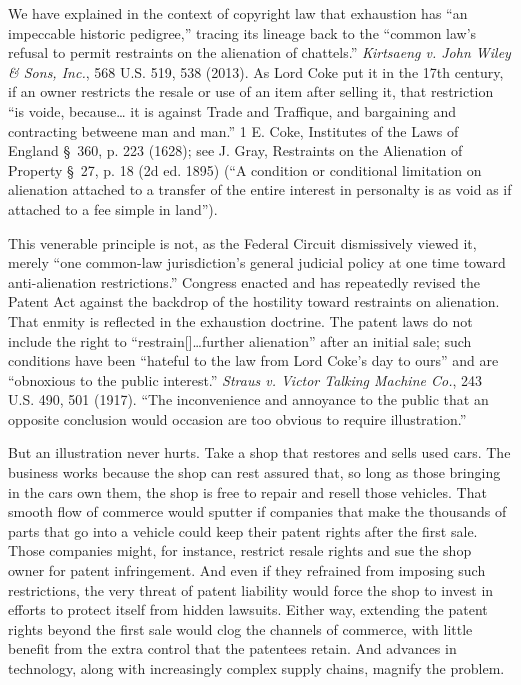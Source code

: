We have explained in the context of copyright law that exhaustion has ``an
impeccable historic pedigree,'' tracing its lineage back to the ``common law's
refusal to permit restraints on the alienation of chattels.'' \textit{Kirtsaeng
v. John Wiley \& Sons, Inc.}, 568 U.S. 519, 538
(2013). As Lord Coke put it in the 17th century, if an owner restricts the
resale or use of an item after selling it, that restriction ``is voide,
because\ldots
it is against Trade and Traffique, and bargaining and contracting betweene
man and man.'' 1 E. Coke, Institutes of the Laws of England \S~360, p. 223
(1628); see J. Gray, Restraints on the Alienation of Property \S~27, p. 18 (2d
ed. 1895) (``A condition or conditional limitation on alienation attached to a
transfer of the entire interest in personalty is as void as if attached to a fee
simple in land'').

This venerable principle is not, as the Federal Circuit dismissively viewed it,
merely ``one common-law jurisdiction's general judicial policy at one time
toward anti-alienation restrictions.'' Congress enacted and
has repeatedly revised the Patent Act against the backdrop of the hostility
toward restraints on alienation. That enmity is reflected in the exhaustion
doctrine. The patent laws do not include the right to ``restrain[]\ldots further
alienation'' after an initial sale; such conditions have been ``hateful to the
law from Lord Coke's day to ours'' and are ``obnoxious to the public interest.''
\textit{Straus v. Victor Talking Machine Co.}, 243 U.S. 490, 501
(1917). ``The inconvenience and annoyance to the public that an
opposite conclusion would occasion are too obvious to require illustration.''

But an illustration never hurts. Take a shop that restores and sells used cars.
The business works because the shop can rest assured that, so long as those
bringing in the cars own them, the shop is free to repair and resell those
vehicles. That smooth flow of commerce would sputter if companies that make the
thousands of parts that go into a vehicle could keep their patent rights after
the first sale. Those companies might, for instance, restrict resale rights and
sue the shop owner for patent infringement. And even if they refrained from
imposing such restrictions, the very threat of patent liability would force the
shop to invest in efforts to protect itself from hidden lawsuits. Either way,
extending the patent rights beyond the first sale would clog the channels of
commerce, with little benefit from the extra control that the patentees retain.
And advances in technology, along with increasingly complex supply chains,
magnify the problem.

